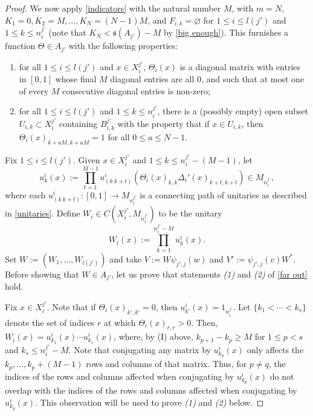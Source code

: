 \documentclass[12pt]{amsart}
\numberwithin{equation}{section}
\theoremstyle{definition}
\theoremstyle{remark}
\begin{document}
\begin{proof}
	We now apply \autoref{indicators} with the natural number $M$, with $m=N$, $K_{1}=0, K_{2}=M, \ldots, K_{N}=(N-1)M$, and $F_{i,k}=\varnothing$ for $1\leq i\leq  l (j')$ and $1\leq k\leq n_{i}^{j'}$ (note that $K_{N}<\mathfrak{s}(A_{j'})-M$ by \autoref{big enough}). This furnishes a function $\Theta\in A_{j'}$ with the following properties:
	\begin{enumerate}[label=(\Roman*)]
		\item for all $1\leq i\leq  l (j')$ and $x\in X_{i}^{j'}$, $\Theta_{i}(x)$ is a diagonal matrix with entries in $[0,1]$ whose final $M$ diagonal entries are all $0$, and such that at most one of every $M$ consecutive diagonal entries is non-zero;
		\item for all $1\leq i\leq  l (j')$ and $1\leq k\leq n_{i}^{j'}$, there is a (possibly empty) open subset $U_{i,k}\subset X_{i}^{j'}$ containing $B_{i,k}^{j'}$ with the property that if $x\in U_{i,k}$, then $\Theta_{i}(x)_{k+aM,k+aM}=1$ for all $0\leq a\leq N-1$.
	\end{enumerate}
	Fix $1\leq i\leq l (j')$. Given $x\in X_{i}^{j'}$ and $1\leq k\leq n_{i}^{j'}-(M-1)$, let
	$$
	u_{k}^{i}(x):=\prod_{t=1}^{M-1}u^{i}_{(k \ k+t)}\left(\Theta_{i}(x)_{k,k} \Delta_{i}'(x)_{k+t,k+t}\right)\in M_{n_{i}^{j'}},
	$$
	where each $u^{i}_{(k \ k+t)}\colon [0,1]\to M_{n_{i}^{j'}}$ is a connecting path of unitaries as described in \autoref{unitaries}. 	
	Define $W_{i}\in C(X_{i}^{j'}, M_{n_{i}^{j'}})$ to be the unitary
	$$
	W_{i}(x):=\prod_{k=1}^{n_{i}^{j'}-M}u_{k}^{i}(x).
	$$
	Set $W:=(W_{1},\ldots,W_{ l (j')})$ and take $V:=W\psi_{j',j}(w)$ and $V':=\psi_{j',j}(v)W^{*}$. Before showing that $W\in A_{j'}$, let us prove that statements \textit{(1)} and \textit{(2)} of \autoref{far out} hold.
	
	Fix $x\in X_{i}^{j'}$. Note that if $\Theta_{i}(x)_{k',k'}=0$, then $u_{k'}^{i}(x)=1_{n_{i}^{j'}}$. Let $\{k_{1}<\cdots<k_{s}\}$ denote the set of indices $r$ at which $\Theta_{i}(x)_{r,r}>0$. Then, $W_{i}(x)=u_{k_{1}}^{i}(x)\cdots u_{k_{s}}^{i}(x)$, where, by (I) above, $k_{p+1}-k_{p}\geq M$ for $1\leq p < s$ and $k_{s}\leq n_{i}^{j'}-M$. Note that conjugating any matrix by $u_{k_{p}}^{i}(x)$ only affects the $k_{p},\ldots, k_{p}+(M-1)$ rows and columns of that matrix. Thus, for $p\not=q$, the indices of the rows and columns affected when conjugating by $u_{k_{p}}^{i}(x)$ do not overlap with the indices of the rows and columns affected when conjugating by $u_{k_{q}}^{i}(x)$. This observation will be used to prove \textit{(1)} and \textit{(2)} below. 
	

\end{proof}
\end{document}

